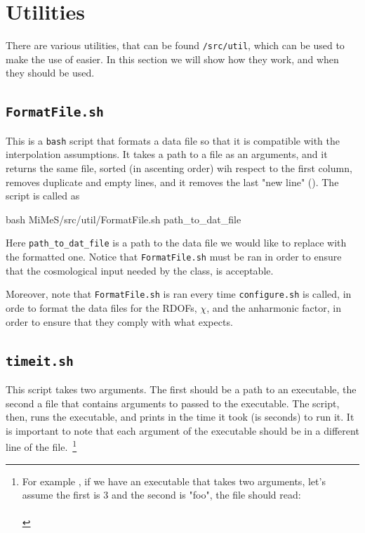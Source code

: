 \documentclass[11pt,a4paper]{article}
\begin{document}
\section{Utilities}\label{app:util}
\setcounter{equation}{0}
%
There are various utilities, that can be found {\tt \mimes/src/util}, which can be used to make the use of \mimes easier. In this section we will show how they work, and when they should be used.

\subsection{\tt FormatFile.sh} 
%
This is a {\tt bash} script that formats a data file so that it is compatible with the interpolation assumptions. It takes a path to a file as an arguments, and it returns the same file, sorted (in ascenting order) wih respect to the first column, removes duplicate and empty lines, and it removes the last "new line" (\ie \cppin{\n}). The script is called as 
%
\begin{cpp}
	bash MiMeS/src/util/FormatFile.sh path_to_dat_file
\end{cpp}
%
Here {\tt path\_to\_dat\_file} is a path to the  data file we would like to replace with the formatted one. Notice that {\tt FormatFile.sh} must be ran in order to ensure that the cosmological input needed by the  class, is acceptable.

Moreover, note that {\tt FormatFile.sh} is ran every time {\tt configure.sh} is called, in orde to format the data files for the RDOFs, $\chi$, and the anharmonic factor, in order to ensure that they comply with what \mimes expects. 


\subsection{\tt timeit.sh}
%
This script takes two arguments. The first should be a path to an executable, the second a file that contains arguments to passed to the executable. The script, then, runs the executable, and prints in  the time it took (is seconds) to run it. It is important to note that each argument of the executable should be in a different line of the file.~\footnote{For example , if we have an executable that takes two arguments, let's assume the first is $3$ and the second is "foo", the file should read: \\
\\
}
\end{document}
